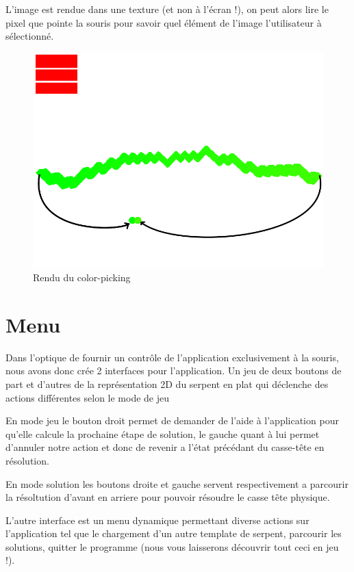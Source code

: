 L'image est rendue dans une texture (et non à l'écran !), on peut alors lire le pixel que pointe la souris pour savoir quel élément de l'image l'utilisateur à sélectionné.

\begin{figure}[h]
 \centering
 \includegraphics[scale=0.3,keepaspectratio=true]{img/colorpick.png}
 \caption{Rendu du color-picking}
 \label{colorPick}
\end{figure}

\section{Menu}
Dans l'optique de fournir un contrôle de l'application exclusivement à la souris, nous avons donc crée 2 interfaces pour l'application.
Un jeu de deux boutons de part et d'autres de la représentation 2D du serpent en plat qui déclenche des actions différentes selon le mode de jeu
\newline

En mode jeu le bouton droit permet de demander de l'aide à l'application pour qu'elle calcule la prochaine étape de solution,
le gauche quant à lui permet d'annuler notre action et donc de revenir a l'état précédant du casse-tête en résolution.
\newline

En mode solution les boutons droite et gauche servent respectivement a parcourir la résoltution d'avant en arriere pour pouvoir résoudre
le casse tête physique.
\newline

L'autre interface est un menu dynamique permettant diverse actions sur l'application tel que le chargement d'un autre template de serpent, parcourir les solutions, quitter le programme (nous vous laisserons découvrir tout ceci en jeu !).
